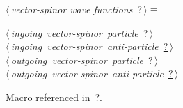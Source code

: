 \documentclass[a4paper,12pt]{amsart}
\renewcommand{\NWtarget}[2]{\hypertarget{#1}{#2}}
\renewcommand{\NWlink}[2]{\hyperlink{#1}{#2}}
\renewcommand{\NWtxtMacroRefIn}{Macro referenced in}
\renewcommand{\NWsep}{${\diamond}$}
\begin{document}
\begin{flushleft} \small
\begin{minipage}{\linewidth}\label{scrap32}\raggedright\small
\NWtarget{nuweb?}{} $\langle\,${\it vector-spinor wave functions}\nobreak\ {\footnotesize {?}}$\,\rangle\equiv$
\vspace{-1ex}
\begin{list}{}{} \item
\mbox{}\verb@@\hbox{$\langle\,${\it ingoing vector-spinor particle}\nobreak\ {\footnotesize \NWlink{nuweb?}{?}}$\,\rangle$}\verb@@\\
\mbox{}\verb@@\hbox{$\langle\,${\it ingoing vector-spinor anti-particle}\nobreak\ {\footnotesize \NWlink{nuweb?}{?}}$\,\rangle$}\verb@@\\
\mbox{}\verb@@\hbox{$\langle\,${\it outgoing vector-spinor particle}\nobreak\ {\footnotesize \NWlink{nuweb?}{?}}$\,\rangle$}\verb@@\\
\mbox{}\verb@@\hbox{$\langle\,${\it outgoing vector-spinor anti-particle}\nobreak\ {\footnotesize \NWlink{nuweb?}{?}}$\,\rangle$}\verb@@{\NWsep}
\end{list}
\vspace{-1.5ex}
\footnotesize
\begin{list}{}{\setlength{\itemsep}{-\parsep}\setlength{\itemindent}{-\leftmargin}}
\item \NWtxtMacroRefIn\ \NWlink{nuweb?}{?}.

\item{}
\end{list}
\end{minipage}\vspace{4ex}
\end{flushleft}
\end{document}

